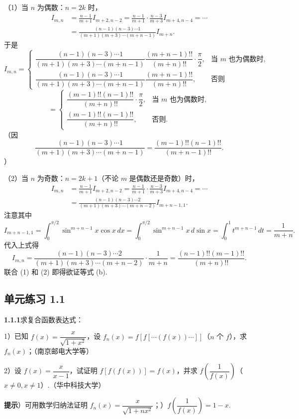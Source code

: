 \documentclass[UTF8,12pt,a4paper,fontset=fandol]{ctexart}
\begin{document}
（1）当 $n$ 为偶数：$n=2k$ 时，
\[
\begin{aligned}
I_{m,n}
&=\frac{n-1}{m+1}I_{m+2,n-2}
=\frac{n-1}{m+1}\cdot\frac{n-3}{m+3}I_{m+4,n-4}=\cdots\\
&=\frac{(n-1)(n-3)\cdots1}{(m+1)(m+3)\cdots(m+n-1)}I_{m+n}.
\end{aligned}
\]
于是
\[
I_{m,n}=
\begin{cases}
\dfrac{(n-1)(n-3)\cdots1}{(m+1)(m+3)\cdots(m+n-1)}
\dfrac{(m+n-1)!!}{(m+n)!!}\cdot\dfrac\pi2, & \text{当 }m\text{ 也为偶数时},\\[1em]
\dfrac{(n-1)(n-3)\cdots1}{(m+1)(m+3)\cdots(m+n-1)}
\dfrac{(m+n-1)!!}{(m+n)!!}, & \text{否则}
\end{cases}
\]
\[
=
\begin{cases}
\dfrac{(m-1)!!(n-1)!!}{(m+n)!!}\cdot\dfrac\pi2, & \text{当 }m\text{ 也为偶数时},\\[1em]
\dfrac{(m-1)!!(n-1)!!}{(m+n)!!}, & \text{否则}.
\end{cases}
\]
（因
\[
  \frac{(n-1)(n-3)\cdots1}{(m+1)(m+3)\cdots(m+n-1)}
  =\frac{(m-1)!!(n-1)!!}{(m+n-1)!!}.
\]
）

（2）当 $n$ 为奇数：$n=2k+1$（不论 $m$ 是偶数还是奇数）时，
\[
\begin{aligned}
I_{m,n}
&=\frac{n-1}{m+1}I_{m+2,n-2}
=\frac{n-1}{m+1}\cdot\frac{n-3}{m+3}I_{m+4,n-4}=\cdots\\
&=\frac{(n-1)(n-3)\cdots2}{(m+1)(m+3)\cdots(m+n-2)}I_{m+n-1,1}.
\end{aligned}
\]
注意其中
\[
I_{m+n-1,1}=\int_0^{\pi/2}\sin^{m+n-1}x\cos x\,dx
=\int_0^{\pi/2}\sin^{m+n-1}x\,d\sin x
=\int_0^1 t^{m+n-1}\,dt=\frac1{m+n}.
\]
代入上式得
\[
  I_{m,n}
  =\frac{(n-1)(n-3)\cdots2}{(m+1)(m+3)\cdots(m+n-2)}\cdot\frac1{m+n}
  =\frac{(n-1)!!(m-1)!!}{(m+n)!!}.
\]
联合 (1) 和 (2) 即得欲证等式 (b).

\subsection*{单元练习 1.1}

\noindent\textbf{1.1.1}\quad 求复合函数表达式：

1）已知 $f(x)=\dfrac{x}{\sqrt{1+x^2}}$，设 $f_n(x)=f[f[\cdots(f(x))\cdots]]$（$n$ 个 $f$），求 $f_n(x)$；（南京邮电大学等）

2）设 $f(x)=\dfrac{x}{x-1}$，试证明 $f[f(f(x))]=f(x)$，并求 $f\left(\dfrac1{f(x)}\right)$（$x\ne0,x\ne1$）.（华中科技大学）

\noindent\textbf{提示}）可用数学归纳法证明 $f_n(x)=\dfrac{x}{\sqrt{1+nx^2}}$；）$f\left(\dfrac1{f(x)}\right)=1-x$.
\end{document}
